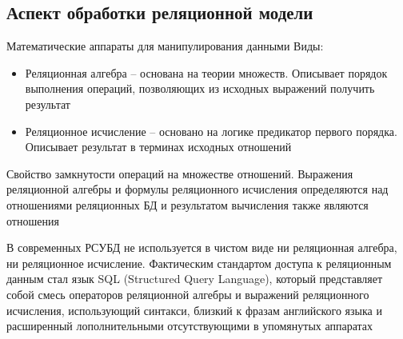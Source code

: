 \documentclass[12pt]{article}
\begin{document}
\newpage

\subsection{Аспект обработки реляционной модели}

\begin{nota}{Математические аппараты для манипулирования данными}
    Виды:

    \begin{itemize}
        \item Реляционная алгебра -- основана на теории множеств. Описывает порядок выполнения операций, позволяющих из исходных выражений получить результат 
        \item Реляционное исчисление -- основано на логике предикатор первого порядка. Описывает результат в терминах исходных отношений 
    \end{itemize}

    Свойство замкнутости операций на множестве отношений. Выражения реляционной алгебры и формулы реляционного исчисления определяются над отношениями реляционных БД и результатом вычисления также являются отношения 

    В современных РСУБД не используется в чистом виде ни реляционная алгебра, ни реляционное исчисление. Фактическим стандартом доступа к реляционным данным стал язык SQL (Structured Query Language), который представляет собой смесь операторов реляционной алгебры и выражений реляционного исчисления, использующий синтакси, близкий к фразам английского языка и расширенный лополнительными отсутствующими в упомянутых аппаратах
\end{nota}
\end{document}
